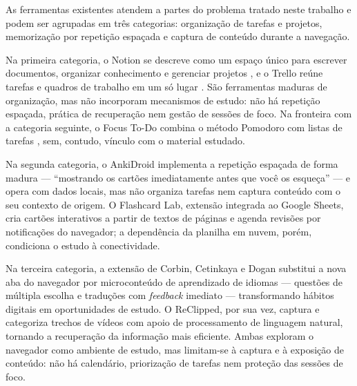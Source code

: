 \documentclass[12pt, %
openright, 
oneside,
a4paper,
english,   %
brazil]{facom-ufu-abntex2}
\begin{document}
As ferramentas existentes atendem a partes do problema tratado neste trabalho
e podem ser agrupadas em três categorias: organização de tarefas e projetos,
memorização por repetição espaçada e captura de conteúdo durante a navegação.

Na primeira categoria, o Notion se descreve como um espaço único para
escrever documentos, organizar conhecimento e gerenciar projetos
\cite{notion}, e o Trello reúne tarefas e quadros de trabalho em um só lugar
\cite{trello}. São ferramentas maduras de organização, mas não incorporam
mecanismos de estudo: não há repetição espaçada, prática de recuperação nem
gestão de sessões de foco. Na fronteira com a categoria seguinte, o Focus
To-Do combina o método Pomodoro com listas de tarefas \cite{PomodoroApp},
sem, contudo, vínculo com o material estudado.

Na segunda categoria, o AnkiDroid implementa a repetição espaçada de forma
madura --- ``mostrando os cartões imediatamente antes que você os esqueça''
\cite{AnkiDroid} --- e opera com dados locais, mas não organiza tarefas nem
captura conteúdo com o seu contexto de origem. O Flashcard Lab, extensão
integrada ao Google Sheets, cria cartões interativos a partir de textos de
páginas e agenda revisões por notificações do navegador; a dependência da
planilha em nuvem, porém, condiciona o estudo à conectividade.

Na terceira categoria, a extensão de Corbin, Cetinkaya e Dogan substitui a
nova aba do navegador por microconteúdo de aprendizado de idiomas ---
questões de múltipla escolha e traduções com \textit{feedback} imediato ---
transformando hábitos digitais em oportunidades de estudo. %
O ReClipped, por sua vez, captura e categoriza trechos de vídeos com apoio de
processamento de linguagem natural, tornando a recuperação da informação mais
eficiente. Ambas exploram o navegador como ambiente de estudo, mas
limitam-se à captura e à exposição de conteúdo: não há calendário,
priorização de tarefas nem proteção das sessões de foco.
\end{document}
